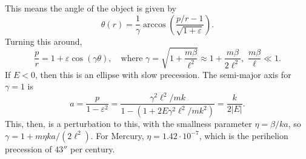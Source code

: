 \documentclass{article}
\begin{document}
        This means the angle of the object is given by
        \begin{equation*}
            \theta(r) = \frac{1}{\gamma} \arccos\left(\frac{p/r - 1}{\sqrt{1 +\varepsilon}}\right).
        \end{equation*}
        Turning this around,
        \begin{equation*}
            \frac{p}{r} = 1 + \varepsilon\cos(\gamma \theta), \quad \mathrm{where}  \,\, \gamma = \sqrt{1 + \frac{m \beta}{\ell^2}} \approx 1 + \frac{m \beta}{2 \ell^2}, \, \, \frac{m \beta}{\ell} \ll 1.
        \end{equation*}
        If $E<0$, then this is an ellipse with slow precession. The semi-major axis for $\gamma = 1$ is
        \begin{equation*}
            a = \frac{p}{1 - \varepsilon^2} = \frac{\gamma^2 \ell^2 / m k}{1 - \left(1 + 2 E \gamma^2 \ell^2/ m k^2\right)} = \frac{k}{2 |E|}.
        \end{equation*}
        This, then, is a perturbation to this, with the smallness parameter $\eta = \beta/k a$, so $\gamma = 1 + m \eta k a / (2 \ell^2)$. For Mercury, $\eta = 1.42 \cdot 10^{-7}$, which is the perihelion precession of $43''$ per century.
\end{document}
